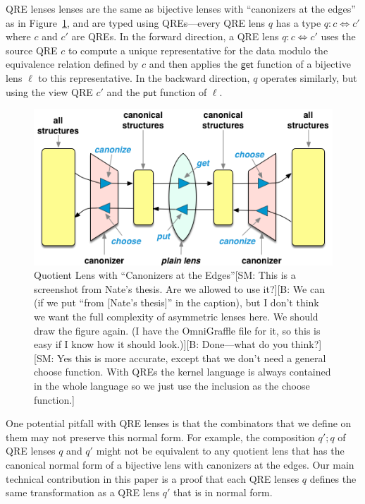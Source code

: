 \documentclass{svproc}
\newcommand{\FINISH}[3]{\ifdraft\textcolor{#1}{[#2: #3]}\fi}
\newcommand{\bcp}[1]{\FINISH{dkred}{B}{#1}}
\newcommand{\sam}[1]{\FINISH{dkpurple}{SM}{#1}}
\newcommand{\kw}[1]{\ensuremath{\mathsf{#1}}}
\newcommand{\get}{\ensuremath{\kw{get}}}
\newcommand{\lput}{\ensuremath{\kw{put}}}
\begin{document}
QRE lenses lenses are the same as bijective lenses with ``canonizers at the
edges'' as in Figure~\ref{fig:attheedges}, and are typed using QREs---every QRE
lens $q$ has a type $q: c \Leftrightarrow c'$ where $c$ and $c'$ are QREs.
In the forward direction, a QRE lens $q: c \Leftrightarrow c'$ uses the source
QRE $c$ to compute a unique representative for the data modulo the equivalence
relation defined by $c$ and then applies the $\get$ function of a bijective
lens $\ell$ to this representative. In the backward direction, $q$ operates
similarly,  but using the view QRE $c'$ and the $\lput$ function of $\ell$.

\begin{figure}[t]
  \centering
  \includegraphics[width=\textwidth]{canonizers-outside}
  \caption{Quotient Lens with ``Canonizers at the Edges''\sam{This is a
      screenshot from Nate's thesis. Are we allowed to use it?}\bcp{We can
      (if we put ``from [Nate's thesis]'' in the caption), but I don't think
      we want the full complexity of asymmetric lenses here.  We should draw
      the figure again.  (I have the OmniGraffle file for it, so this is
      easy if I know how it should look.)}\bcp{Done---what do you think?}
      \sam{Yes this is more accurate, except that we don't need a general choose
      function. With QREs the kernel language is always contained in the whole
      language so we just use the inclusion as the choose function.}}
  \label{fig:attheedges}
\end{figure}

One potential pitfall with QRE lenses is that the combinators that we define on
them may not preserve this normal form. For example, the composition $q'; q$ of
QRE lenses $q$ and $q'$ might not be equivalent to any quotient lens that has
the canonical normal form of a bijective lens with canonizers at the edges.
Our main technical contribution in this paper is a proof that each QRE lenses
$q$ defines the same transformation as a QRE lens $q'$ that is in normal form.
\end{document}
